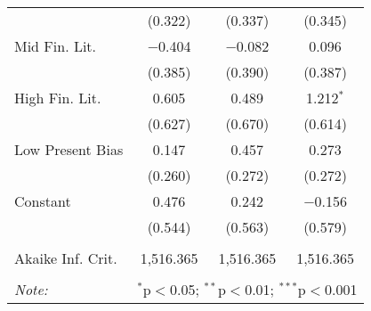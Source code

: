 \begin{table}[!htbp]
\begin{tabular}{@{\extracolsep{5pt}}lccc}
  & (0.322) & (0.337) & (0.345) \\ 
  Mid Fin. Lit. & $-$0.404 & $-$0.082 & 0.096 \\ 
  & (0.385) & (0.390) & (0.387) \\ 
  High Fin. Lit. & 0.605 & 0.489 & 1.212$^{*}$ \\ 
  & (0.627) & (0.670) & (0.614) \\ 
  Low Present Bias & 0.147 & 0.457 & 0.273 \\ 
  & (0.260) & (0.272) & (0.272) \\ 
  Constant & 0.476 & 0.242 & $-$0.156 \\ 
  & (0.544) & (0.563) & (0.579) \\ 
 \hline \\[-1.8ex] 
Akaike Inf. Crit. & 1,516.365 & 1,516.365 & 1,516.365 \\ 
\hline 
\hline \\[-1.8ex] 
\textit{Note:}  & \multicolumn{3}{l}{$^{*}$p$<$0.05; $^{**}$p$<$0.01; $^{***}$p$<$0.001} \\ 
\end{tabular} 
\end{table} 
